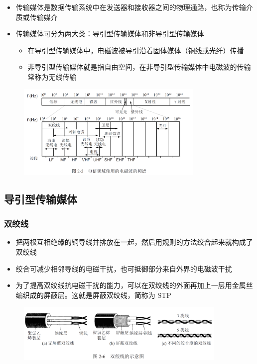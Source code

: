 \documentclass[cs4size,a4paper,10pt]{ctexart}
\begin{document}
	\begin{itemize}
		\item 传输媒体是数据传输系统中在发送器和接收器之间的物理通路，也称为传输介质或传输媒介
		\item 传输媒体可分为两大类：导引型传输媒体和非导引型传输媒体
		\begin{itemize}
			\item 在导引型传输媒体中，电磁波被导引沿着固体媒体（铜线或光纤）传播
			\item 非导引型传输媒体就是指自由空间，在非导引型传输媒体中电磁波的传输常称为无线传输
		\end{itemize}
	\end{itemize}

	\begin{figure}[H]
		\centering
		\includegraphics[width=0.8\textwidth]{img/2.5}
	\end{figure}

	\subsection{导引型传输媒体}

	\subsubsection{双绞线}
	\begin{itemize}
		\item 把两根互相绝缘的铜导线并排放在一起，然后用规则的方法绞合起来就构成了双绞线
		\item 绞合可减少相邻导线的电磁干扰，也可抵御部分来自外界的电磁波干扰
		\item 为了提高双绞线抗电磁干扰的能力，可以在双绞线的外面再加上一层用金属丝编织成的屏蔽层。这就是屏蔽双绞线，简称为 STP
	\end{itemize}

	\begin{figure}[H]
		\centering
		\includegraphics[width=0.9\textwidth]{img/2.6}
	\end{figure}
\end{document}
